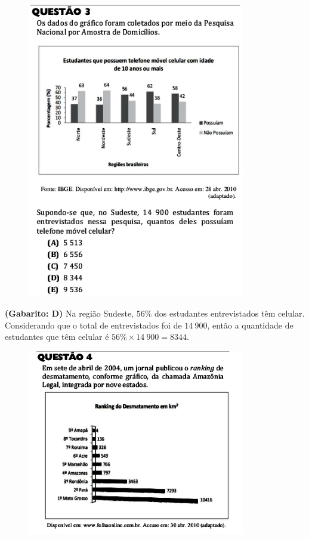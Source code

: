 \documentclass[a4paper]{article}
\begin{document}
\begin{figure}[H]
	\begin{center}
		\includegraphics[width=9.5cm]{L3Q3.png}
	\end{center}
\end{figure}
\par\textbf{(Gabarito: D)} Na região Sudeste, $56\%$ dos estudantes entrevistados têm celular. Considerando que o total de entrevistados foi de $14\ 900$, então a quantidade de estudantes que têm celular é $56\% \times 14\ 900 = 8344$.
\begin{figure}[H]
	\begin{center}
		\includegraphics[width=9.5cm]{L3Q4_1.png}
	\end{center}
\end{figure}
\end{document}
